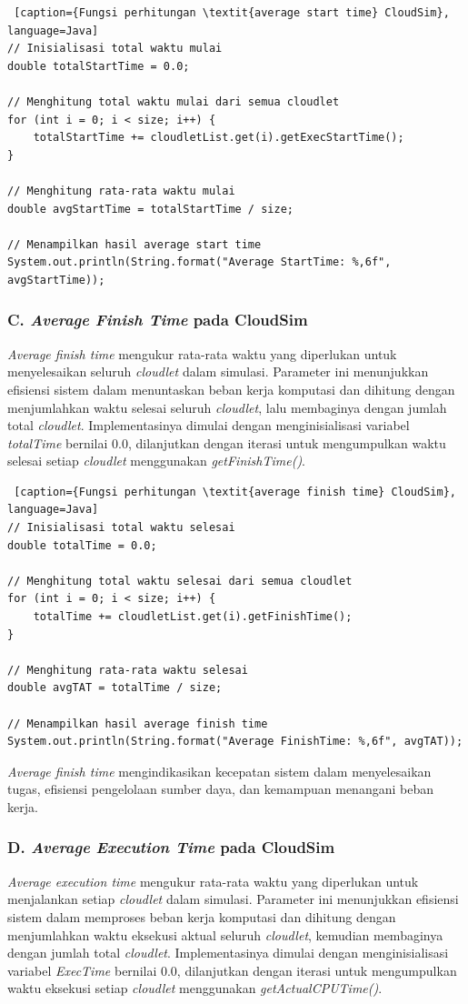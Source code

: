 \begin{lstlisting} [caption={Fungsi perhitungan \textit{average start time} CloudSim}, language=Java]
// Inisialisasi total waktu mulai
double totalStartTime = 0.0;

// Menghitung total waktu mulai dari semua cloudlet
for (int i = 0; i < size; i++) {
    totalStartTime += cloudletList.get(i).getExecStartTime();
}

// Menghitung rata-rata waktu mulai
double avgStartTime = totalStartTime / size;

// Menampilkan hasil average start time
System.out.println(String.format("Average StartTime: %,6f", avgStartTime));
\end{lstlisting}

\subsubsection{C. \textit{Average Finish Time} pada CloudSim}
\textit{Average finish time} mengukur rata-rata waktu yang diperlukan untuk menyelesaikan seluruh \textit{cloudlet} dalam simulasi. Parameter ini menunjukkan efisiensi sistem dalam menuntaskan beban kerja komputasi dan dihitung dengan menjumlahkan waktu selesai seluruh \textit{cloudlet}, lalu membaginya dengan jumlah total \textit{cloudlet}. Implementasinya dimulai dengan menginisialisasi variabel \textit{totalTime} bernilai 0.0, dilanjutkan dengan iterasi untuk mengumpulkan waktu selesai setiap \textit{cloudlet} menggunakan \textit{getFinishTime()}. 

\begin{lstlisting} [caption={Fungsi perhitungan \textit{average finish time} CloudSim}, language=Java]
// Inisialisasi total waktu selesai
double totalTime = 0.0;

// Menghitung total waktu selesai dari semua cloudlet
for (int i = 0; i < size; i++) {
    totalTime += cloudletList.get(i).getFinishTime();
}

// Menghitung rata-rata waktu selesai
double avgTAT = totalTime / size;

// Menampilkan hasil average finish time
System.out.println(String.format("Average FinishTime: %,6f", avgTAT));
\end{lstlisting}

\textit{Average finish time} mengindikasikan kecepatan sistem dalam menyelesaikan tugas, efisiensi pengelolaan sumber daya, dan kemampuan menangani beban kerja.

\subsubsection{D. \textit{Average Execution Time} pada CloudSim}
\textit{Average execution time} mengukur rata-rata waktu yang diperlukan untuk menjalankan setiap \textit{cloudlet} dalam simulasi. Parameter ini menunjukkan efisiensi sistem dalam memproses beban kerja komputasi dan dihitung dengan menjumlahkan waktu eksekusi aktual seluruh \textit{cloudlet}, kemudian membaginya dengan jumlah total \textit{cloudlet}. Implementasinya dimulai dengan menginisialisasi variabel \textit{ExecTime} bernilai 0.0, dilanjutkan dengan iterasi untuk mengumpulkan waktu eksekusi setiap \textit{cloudlet} menggunakan \textit{getActualCPUTime()}. 

